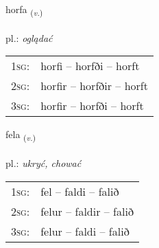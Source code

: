 \documentclass[frontgrid, backgrid]{flacards}\usepackage[]{graphicx}\usepackage[]{xcolor}
\begin{document}
\renewcommand{\blhead}{\vskip5pt {\small\bfseries\footnotesize Sagnorð | czasownik }}
\renewcommand{\bcfoot}{\vskip5pt \hspace{2pt}{\small\bfseries\footnotesize 1K}}


{horfa \small{\textsubscript{(\textit{v.})}} \\[1ex] %
\textphonetic{[hɔrva]} \\
pl.: \emph{oglądać} \\  [2ex]
\renewcommand*{\arraystretch}{0.8}
\begin{tabular}{p{1cm}l}
\textsc{1sg}: & horfi -- horfði -- horft \\ 
\textsc{2sg}: & horfir -- horfðir -- horft \\ 
\textsc{3sg}: & horfir -- horfði -- horft \\ 
\end{tabular}
}

\renewcommand{\flhead}{\vskip5pt \fboxsep=0pt {\small\bfseries\footnotesize Sagnorð | czasownik}}
\renewcommand{\fcfoot}{\vskip5pt \fboxsep=0pt \hspace{2pt}{\small\bfseries\footnotesize 1K}}

\renewcommand{\blhead}{\vskip5pt {\small\bfseries\footnotesize Sagnorð | czasownik }}
\renewcommand{\bcfoot}{\vskip5pt \hspace{2pt}{\small\bfseries\footnotesize 1K}}


{fela \small{\textsubscript{(\textit{v.})}} \\[1ex] %
\textphonetic{[fɛːla]} \\
pl.: \emph{ukryć, chować} \\  [2ex]
\renewcommand*{\arraystretch}{0.8}
\begin{tabular}{p{1cm}l}
\textsc{1sg}: & fel -- faldi -- falið \\ 
\textsc{2sg}: & felur -- faldir -- falið \\ 
\textsc{3sg}: & felur -- faldi -- falið \\ 
\end{tabular}
}
\end{document}
